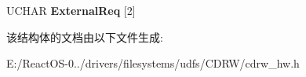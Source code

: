 \begin{DoxyCompactItemize}
\begin{tabbing}
\end{tabbing}\item 
\mbox{\label{struct___e_v_e_n_t___s_t_a_t___e_x_t___r_e_q___b_l_o_c_k_afa215b567d6d8535e8eb612c4e435fa7}} 
U\+C\+H\+AR {\bfseries External\+Req} \mbox{[}2\mbox{]}
\end{DoxyCompactItemize}


该结构体的文档由以下文件生成\+:\begin{DoxyCompactItemize}
\item 
E\+:/\+React\+O\+S-\/0../drivers/filesystems/udfs/\+C\+D\+R\+W/cdrw\+\_\+hw.\+h\end{DoxyCompactItemize}
